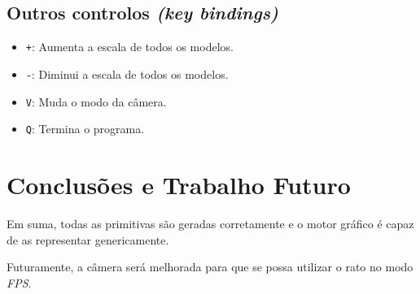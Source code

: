 \documentclass[a4paper]{article}
\begin{document}
\subsection{Outros controlos \textit{(key bindings)}}

\begin{itemize}
    \item \texttt{+}: Aumenta a escala de todos os modelos.
    \item \texttt{-}: Diminui a escala de todos os modelos.
    \item \texttt{V}: Muda o modo da câmera.
    \item \texttt{Q}: Termina o programa.
\end{itemize}

\section{Conclusões e Trabalho Futuro}
Em suma, todas as primitivas são geradas corretamente e o motor gráfico é capaz de as representar genericamente.

Futuramente, a câmera será melhorada para que se possa utilizar o rato no modo \textit{FPS}.
\end{document}
